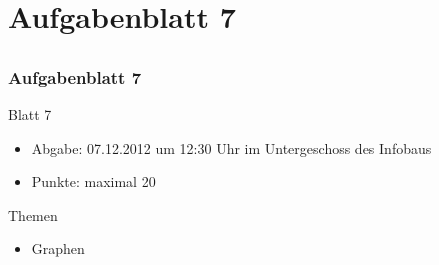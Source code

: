 

\section[Blatt 7]{Aufgabenblatt 7}
\subsection*{}
\begin{frame}
	\frametitle{Aufgabenblatt 7}
	\begin{block}{Blatt 7}
		\begin{itemize}
			\item Abgabe: 07.12.2012 um 12:30 Uhr im Untergeschoss des Infobaus
			\item Punkte: maximal 20
		\end{itemize}
  	\end{block}
	\begin{block}{Themen}
		\begin{itemize}
	  		\item Graphen
	 	\end{itemize}
	\end{block}
\end{frame}
